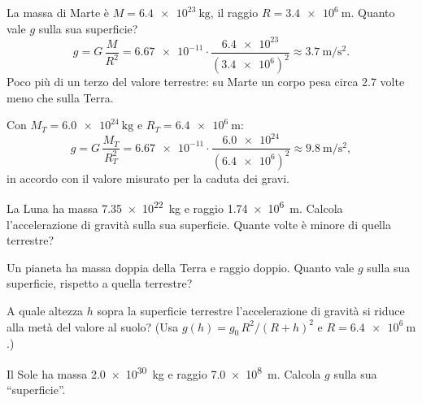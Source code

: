 \begin{testexample}
La massa di Marte è $M = \SI{6,4e23}{\kilo\gram}$, il raggio $R = \SI{3,4e6}{\metre}$. Quanto vale $g$ sulla sua superficie?
\[ g = G\,\frac{M}{R^2} = \num{6,67e-11} \cdot \frac{\num{6,4e23}}{(\num{3,4e6})^2} \approx \SI{3,7}{\metre\per\second\squared}. \]
Poco più di un terzo del valore terrestre: su Marte un corpo pesa circa \num{2,7} volte meno che sulla Terra.
\end{testexample}

\begin{testexample}
Con $M_T = \SI{6,0e24}{\kilo\gram}$ e $R_T = \SI{6,4e6}{\metre}$:
\[ g = G\,\frac{M_T}{R_T^2} = \num{6,67e-11} \cdot \frac{\num{6,0e24}}{(\num{6,4e6})^2} \approx \SI{9,8}{\metre\per\second\squared}, \]
in accordo con il valore misurato per la caduta dei gravi.
\end{testexample}

\begin{esercizio}
La Luna ha massa \SI{7,35e22}{\kilo\gram} e raggio \SI{1,74e6}{\metre}. Calcola l'accelerazione di gravità sulla sua superficie. Quante volte è minore di quella terrestre?\\
\end{esercizio}

\begin{esercizio}
Un pianeta ha massa doppia della Terra e raggio doppio. Quanto vale $g$ sulla sua superficie, rispetto a quella terrestre?\\
\end{esercizio}

\begin{esercizio}
A quale altezza $h$ sopra la superficie terrestre l'accelerazione di gravità si riduce alla metà del valore al suolo? (Usa $g(h) = g_0\,R^2/(R+h)^2$ e $R = \SI{6,4e6}{\metre}$.)\\
\end{esercizio}

\begin{esercizio}
Il Sole ha massa \SI{2,0e30}{\kilo\gram} e raggio \SI{7,0e8}{\metre}. Calcola $g$ sulla sua ``superficie''.\\
\end{esercizio}

